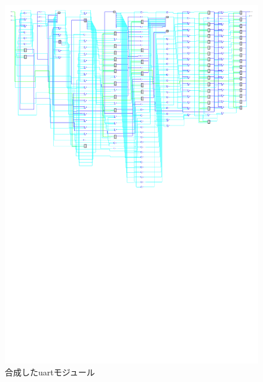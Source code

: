 \documentclass[a4paper,10pt]{article}
\begin{document}
\begin{figure}[H] %
  \centering
  \includegraphics[width=\linewidth]{uart.pdf}
  \caption{合成したuartモジュール}
  \label{fig:uart_module}
\end{figure}
\end{document}
